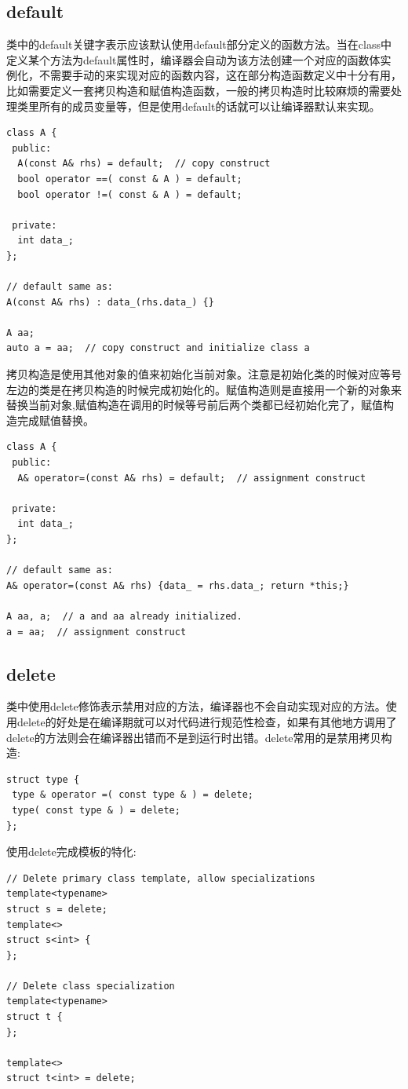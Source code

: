 \documentclass[12pt]{book}
\begin{document}
\subsection{default}
类中的default关键字表示应该默认使用default部分定义的函数方法。当在class中定义某个方法为default属性时，编译器会自动为该方法创建一个对应的函数体实例化，不需要手动的来实现对应的函数内容，这在部分构造函数定义中十分有用，比如需要定义一套拷贝构造和赋值构造函数，一般的拷贝构造时比较麻烦的需要处理类里所有的成员变量等，但是使用default的话就可以让编译器默认来实现。
\begin{lstlisting}
class A {
 public:
  A(const A& rhs) = default;  // copy construct
  bool operator ==( const & A ) = default;
  bool operator !=( const & A ) = default;
  
 private:
  int data_;
};

// default same as:
A(const A& rhs) : data_(rhs.data_) {}

A aa;
auto a = aa;  // copy construct and initialize class a
\end{lstlisting}
拷贝构造是使用其他对象的值来初始化当前对象。注意是初始化类的时候对应等号左边的类是在拷贝构造的时候完成初始化的。赋值构造则是直接用一个新的对象来替换当前对象,赋值构造在调用的时候等号前后两个类都已经初始化完了，赋值构造完成赋值替换。
\begin{lstlisting}
class A {
 public:
  A& operator=(const A& rhs) = default;  // assignment construct

 private:
  int data_;
};
	
// default same as:
A& operator=(const A& rhs) {data_ = rhs.data_; return *this;}
	
A aa, a;  // a and aa already initialized.
a = aa;  // assignment construct
\end{lstlisting}

\subsection{delete}
类中使用delete修饰表示禁用对应的方法，编译器也不会自动实现对应的方法。使用delete的好处是在编译期就可以对代码进行规范性检查，如果有其他地方调用了delete的方法则会在编译器出错而不是到运行时出错。delete常用的是禁用拷贝构造:
\begin{lstlisting}
struct type {
 type & operator =( const type & ) = delete;
 type( const type & ) = delete;
};
\end{lstlisting}

使用delete完成模板的特化:
\begin{lstlisting}
// Delete primary class template, allow specializations
template<typename>
struct s = delete;
template<>
struct s<int> {
};

// Delete class specialization
template<typename>
struct t {
};

template<>
struct t<int> = delete;
\end{lstlisting}
\end{document}
